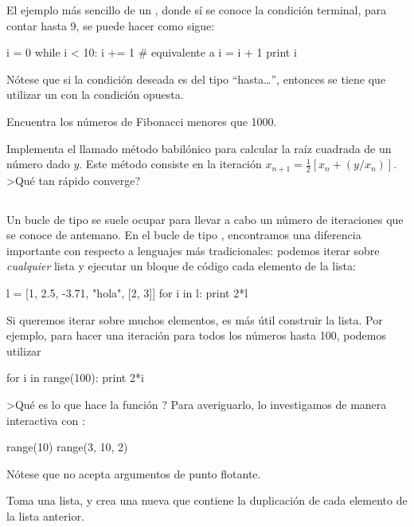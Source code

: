 El ejemplo más sencillo de un , donde sí se conoce la condición terminal, para contar hasta 9, se puede hacer como sigue:
\begin{python}
i = 0
while i < 10:
  i += 1	# equivalente a i = i + 1
  print i
\end{python}
Nótese que si la condición deseada es del tipo ``hasta\ldots'', entonces se tiene que utilizar un  con la condición opuesta. 

\ej Encuentra los números de Fibonacci menores que 1000.

\ej Implementa el llamado método babilónico para calcular la raíz cuadrada de un número dado $y$. Este método consiste en la iteración 
$x_{n+1} = \frac{1}{2} \left[x_n + (y / x_n) \right]$. >Qué tan rápido converge?



\subsection{}
Un bucle de tipo  se suele ocupar para llevar a cabo un número de iteraciones que se conoce de antemano.
En el bucle de tipo , encontramos una diferencia importante con respecto a lenguajes más tradicionales: podemos iterar sobre \emph{cualquier} lista y ejecutar un bloque de código  cada elemento de la lista:
\begin{python}
l = [1, 2.5, -3.71, "hola", [2, 3]]
for i in l:
  print 2*l
\end{python}

Si queremos iterar sobre muchos elementos, es más útil construir la lista. Por ejemplo, para hacer una iteración para todos los números hasta 100, podemos utilizar
\begin{python}
for i in range(100):
  print 2*i
\end{python}
>Qué es lo que hace la función ? Para averiguarlo, lo investigamos de manera interactiva con :
\begin{python}
range(10)
range(3, 10, 2)
\end{python}
Nótese que  no acepta argumentos de punto flotante.

\ej Toma una lista, y crea una nueva que contiene la duplicación de cada elemento de la lista anterior.


